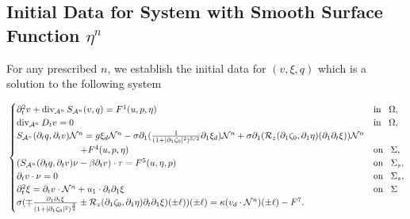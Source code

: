 \documentclass[letterpaper,reqno,10pt,twoside]{amsart}
\theoremstyle{definition}
\theoremstyle{remark}
\def\p{\partial}
\begin{document}
\begin{appendix}
			\subsection{Initial Data for System with Smooth Surface Function \texorpdfstring{$\eta^{n}$}{}}
			For any prescribed $n$, we establish the initial data for $(v,\xi,q)$ which is a solution to the following system
			
			\begin{equation}{\label{eq:quasi_linear_{sn}}}
				\begin{cases}
					\partial_{t}^{2}v+\operatorname{div}_{\mathcal{A}^{n}}S_{\mathcal{A}^{n}}(v,q)=F^{1}(u,p,\eta)~~~&\operatorname{in}~~\Omega,\\
					\operatorname{div}_{\mathcal{A}^{n}}D_{t}v=0~~~&\operatorname{in}~~\Omega,\\
					S_{\mathcal{A}^{n}}(\p_{t}q,\p_{t}v)\mathcal{N}^{n}=g\xi_{d}\mathcal{N}^{n}-\sigma\partial_{1}(\frac{1}{(1+\vert \partial_{1}\zeta_{0}\vert^{2})^{3/2}}\partial_{1}\xi_{d})\mathcal{N}^{n}
					+\sigma\partial_{1}(\mathcal{R}_{z}(\partial_{1}\zeta_{0},\partial_{1}\eta)(\partial_{1}\p_{t}\xi))\mathcal{N}^{n}\\\quad\quad\quad\quad\quad\quad\quad+F^{4}(u,p,\eta)~~~&\operatorname{on}~~\Sigma,\\
					(S_{\mathcal{A}^{n}}(\p_{t}q,\p_{t}v)\nu-\beta \p_{t}v)\cdot \tau=F^{5}(u,\eta,p)~~~&\operatorname{on}~~\Sigma_{s},\\
					\p_{t}v\cdot \nu=0~~~&\operatorname{on}~~\Sigma_{s},\\
					\partial_{t}^{2}\xi=\p_{t}v\cdot \mathcal{N}^{n}+u_{1}\cdot\partial_{t}\p_{1}\xi~~~&\operatorname{on}~~\Sigma\\
					\sigma(\mp \frac{\partial_{1}\p_{t}\xi}{(1+\vert \partial_{1}\zeta_{0}\vert^{2})^{\frac{3}{2}}}\pm \mathcal{R}_{z}(\partial_{1}\zeta_{0},\partial_{1}\eta)\partial_{t}\partial_{1}\xi)(\pm \ell))(\pm\ell)=\kappa (v_{d}\cdot \mathcal{N}^{n})(\pm \ell)-{F}^{7}.
				\end{cases}
			\end{equation}
			

\end{appendix}
\end{document}
